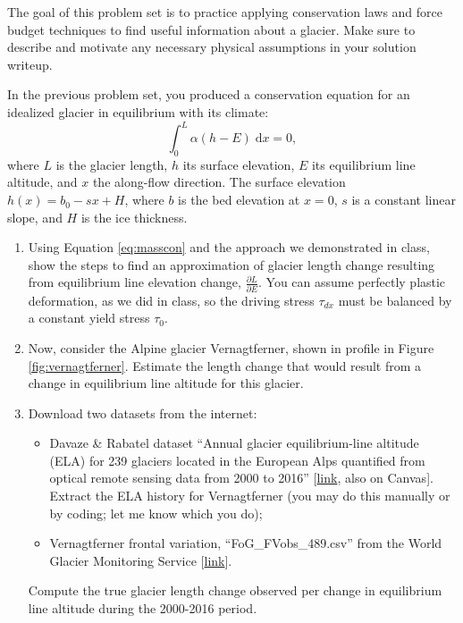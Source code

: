 \documentclass[12pt]{article}
\newenvironment{problem}[2][Problem]{\begin{trivlist}
\item[\hskip \labelsep {\bfseries #1}\hskip \labelsep {\bfseries #2.}]}{\end{trivlist}}
\begin{document}
\pagestyle{fancy}
\fancyhf{}


\noindent The goal of this problem set is to practice applying conservation laws and force budget techniques to find useful information about a glacier.  Make sure to describe and motivate any necessary physical assumptions in your solution writeup.

\begin{problem}{1}
[7 pts] In the previous problem set, you produced a conservation equation for an idealized glacier in equilibrium with its climate:
\begin{equation}\label{eq:masscon}
    \int_0^L \alpha (h-E) \;\text{d}x =0,
\end{equation}
where $L$ is the glacier length, $h$ its surface elevation, $E$ its equilibrium line altitude, and $x$ the along-flow direction.  The surface elevation $h(x) = b_0 - sx + H$, where $b$ is the bed elevation at $x=0$, $s$ is a constant linear slope, and $H$ is the ice thickness.
\renewcommand{\labelenumi}{(\alph{enumi})}
\begin{enumerate}[itemsep=2pt]
    \item Using Equation \ref{eq:masscon} and the approach we demonstrated in class, show the steps to find an approximation of glacier length change resulting from equilibrium line elevation change, $\frac{\partial L}{\partial E}$.  You can assume perfectly plastic deformation, as we did in class, so the driving stress $\tau_{dx}$ must be balanced by a constant yield stress $\tau_0$.

    \item Now, consider the Alpine glacier Vernagtferner, shown in profile in Figure \ref{fig:vernagtferner}.  Estimate the length change that would result from a change in equilibrium line altitude for this glacier.
    
    \item Download two datasets from the internet:
        \begin{itemize}
            \item Davaze \& Rabatel dataset ``Annual glacier equilibrium-line altitude (ELA) for 239 glaciers located in the European Alps quantified from optical remote sensing data from 2000 to 2016'' [\textcolor{blue}{\href{https://www.theia-land.fr/en/product/annual-glacier-equilibrium-line-altitude/}{link}}, also on Canvas]. Extract the ELA history for Vernagtferner (you may do this manually or by coding; let me know which you do);
            \item Vernagtferner frontal variation, ``FoG\_FVobs\_489.csv'' from the World Glacier Monitoring Service [\textcolor{blue}{\href{https://wgms.ch/products_ref_glaciers/vernagtferner-alps/}{link}}].
        \end{itemize}
    Compute the true glacier length change observed per change in equilibrium line altitude during the 2000-2016 period.


\end{enumerate}
\end{problem}
\end{document}
